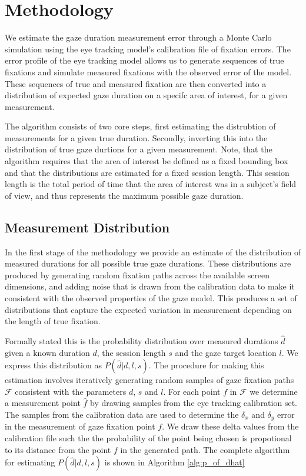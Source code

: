 \documentclass[12pt,a4paper]{article}
\numberwithin{equation}{section}
\begin{document}
\section{Methodology}

We estimate the gaze duration measurement error through a Monte Carlo simulation
using the eye tracking model's calibration file of fixation errors.
The error profile of the eye tracking model allows us to generate sequences of true
fixations and simulate measured fixations with the observed error of the model.
These sequences of true and measured fixation are then converted into a distribution
of expected gaze duration on a specifc area of interest, for a given measurement. 

The algorithm consists of two core steps, first estimating the distrubtion of measurements
for a given true duration. Secondly, inverting this into the distribution of true
gaze durtions for a given measurement. Note, that the algorithm requires that the area of
interest be defined as a fixed bounding box and that the distributions are estimated for
a fixed session length. This session length is the total period of time that the area of
interest was in a subject's field of view, and thus represents the maximum possible gaze
duration.

\subsection{Measurement Distribution}

In the first stage of the methodology we provide an estimate of the distribution of measured
durations for all possible true gaze durations. These distributions are produced by generating
random fixation paths across the available screen dimensions, and adding noise that is 
drawn from the calibration data to make it consistent with the observed properties of the gaze model.
This produces a set of distributions that capture the expected
variation in measurement depending on the length of true fixation.

Formally stated this is the probability distribution over measured durations $\hat{d}$ given a
known duration $d$, the session length $s$ and the gaze target location $l$. 
We express this distribution as $P(\hat{d}|d,l,s)$. The
procedure for making this estimation involves iteratively generating random samples
of gaze fixation paths $\mathcal{F}$ consistent with the parameters $d$, $s$ and $l$. 
For each point $f$ in $\mathcal{F}$ we determine a measurement point $\hat{f}$ 
by drawing samples from the eye tracking calibration set. 
The samples from the calibration data are used to determine the $\delta_x$ and $\delta_y$ 
error in the measurement of gaze fixation point $f$. 
We draw these delta values from the calibration file such the
the probability of the point being chosen is propotional to its distance from the point $f$
in the generated path. The complete algorithm
for estimating $P(\hat{d}|d,l,s)$ is shown in Algorithm \ref{alg:p_of_dhat}    
\end{document}
